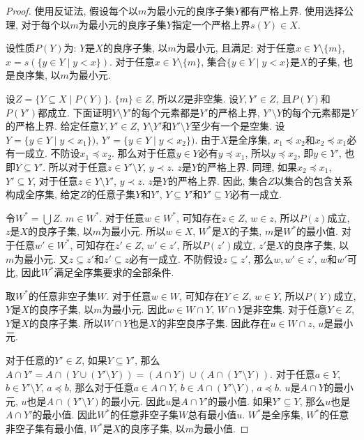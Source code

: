 \begin{proof}
	使用反证法, 假设每个以$m$为最小元的良序子集$Y$都有严格上界. 使用选择公理, 对于每个以$m$为最小元的良序子集$Y$指定一个严格上界$s(Y)\in X$.
	
	设性质$P(Y)$为: $Y$是$X$的良序子集, 以$m$为最小元, 且满足: 对于任意$x\in Y\setminus \{m\}$, $x=s(\{y\in Y\mid y<x\})$. 对于任意$x\in Y\setminus \{m\}$, 集合$\{y\in Y\mid y<x\}$是$X$的子集, 也是良序集, 以$m$为最小元.
	
	设$Z=\{Y\subseteq X\mid P(Y)\}$. $\{m\}\in Z$, 所以$Z$是非空集. 设$Y,Y'\in Z$, 且$P(Y)$和$P(Y')$都成立. 下面证明$Y\setminus Y'$的每个元素都是$Y'$的严格上界, $Y'\setminus Y$的每个元素都是$Y$的严格上界. 给定任意$Y,Y'\in Z$, $Y\setminus Y'$和$Y'\setminus Y$至少有一个是空集. 设$Y=\{y\in Y\mid y<x_1\})$, $Y'=\{y\in Y\mid y<x_2\})$. 由于$X$是全序集, $x_1\preccurlyeq x_2$和$x_2\preccurlyeq x_1$必有一成立. 不防设$x_1\preccurlyeq x_2$. 那么对于任意$y\in Y$必有$y\preccurlyeq x_1$, 所以$y\preccurlyeq x_2$, 即$y\in Y'$, 也即$Y\subseteq Y'$. 所以对于任意$z\in Y'\setminus Y$, $y\prec z$. $z$是$Y$的严格上界. 同理, 如果$x_2\preccurlyeq x_1$, $Y'\subseteq Y$, 对于任意$z\in Y\setminus Y'$, $y\prec z$. $z$是$Y$的严格上界. 因此, 集合$Z$以集合的包含关系构成全序集, 给定$Z$的任意子集$Y$和$Y'$, $Y\subseteq Y'$和$Y'\subseteq Y$必有一成立.
	
	令$W^*=\bigcup Z$. $m\in W^*$. 对于任意$w\in W^*$, 可知存在$z\in Z$, $w\in z$, 所以$P(z)$成立, $z$是$X$的良序子集, 以$m$为最小元. 所以$w\in X$, $W^*$是$X$的子集, $m$是$W^*$的最小值. 对于任意$w'\in W^*$, 可知存在$z'\in Z$, $w'\in z'$, 所以$P(z')$成立, $z'$是$X$的良序子集, 以$m$为最小元. 又$z\subseteq z'$和$z'\subseteq z$必有一成立. 不防假设$z\subseteq z'$, 那么$w,w'\in z'$, $w$和$w'$可比, 因此$W^*$满足全序集要求的全部条件.
	
	取$W^*$的任意非空子集$W$. 对于任意$w\in W$, 可知存在$Y\in Z$, $w\in Y$, 所以$P(Y)$成立, $Y$是$X$的良序子集, 以$m$为最小元. 因此$w\in W\cap Y$, $W\cap Y$是非空集. 对于任意$Y\in Z$, $Y$是$X$的良序子集. 所以$W\cap Y$也是$X$的非空良序子集. 因此存在$u\in W\cap z$, $u$是最小元.
	
	对于任意的$Y'\in Z$, 如果$Y\subseteq Y'$, 那么$A\cap Y'=A\cap (Y\cup (Y'\setminus Y))=(A\cap Y)\cup (A\cap (Y'\setminus Y))$. 对于任意$a\in Y$, $b\in Y'\setminus Y$, $a\preccurlyeq b$, 那么对于任意$a\in A\cap Y$, $b\in A\cap (Y'\setminus Y)$, $a\preccurlyeq b$. $u$是$A\cap Y$的最小元, $u$也是$A\cap (Y'\setminus Y)$的最小元. 因此$u$是$A\cap Y'$的最小值. 如果$Y'\subseteq Y$, 那么$u$也是$A\cap Y'$的最小值. 因此$W^*$的任意非空子集$W$总有最小值$u$. $W^*$是全序集, $W^*$的任意非空子集有最小值, $W^*$是$X$的良序子集, 以$m$为最小值.
	

\end{proof}
